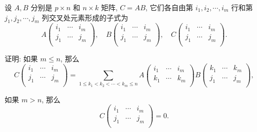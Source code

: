 \documentclass{ctexart}
\begin{document}
\begin{exercisec}[4.3.7]
    设 $A,B$ 分别是 $p\times n$ 和 $n\times k$ 矩阵, $C=AB$, 它们各自由第 $i_1,i_2,\cdots,i_m$ 行和第 $j_1,j_2,\cdots,j_m$ 列交叉处元素形成的子式为
    \[A\begin{pmatrix}
        i_1 & \cdots & i_m \\
        j_1 & \cdots & j_m \\
    \end{pmatrix},\quad B\begin{pmatrix}
        i_1 & \cdots & i_m \\
        j_1 & \cdots & j_m \\
    \end{pmatrix},\quad C\begin{pmatrix}
        i_1 & \cdots & i_m \\
        j_1 & \cdots & j_m \\
    \end{pmatrix}.\]

    证明: 如果 $m\leq n$, 那么
    \[C\begin{pmatrix}
        i_1 & \cdots & i_m \\
        j_1 & \cdots & j_m \\
    \end{pmatrix}=\sum\limits_{1\leq k_1<k_2<\cdots<k_m\leq n}A\begin{pmatrix}
        i_1 & \cdots & i_m \\
        k_1 & \cdots & k_m \\
    \end{pmatrix}B\begin{pmatrix}
        k_1 & \cdots & k_m \\
        j_1 & \cdots & j_m \\
    \end{pmatrix},\]

    如果 $m>n$, 那么
    \[C\begin{pmatrix}
        i_1 & \cdots & i_m \\
        j_1 & \cdots & j_m \\
    \end{pmatrix}=0.\]
\end{exercisec}
\end{document}
